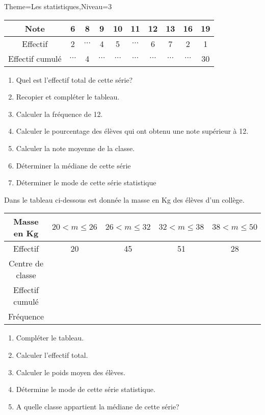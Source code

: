 \documentclass[a4paper,12pt]{article}
\begin{document}
\begin{Maquette}[Fiche]{Theme=Les statistiques,Niveau=3}
\begin{exercice}
\begin{tabular}{|c|c|c|c|c|c|c|c|c|c|}
\hline 
Note & 6 & 8 & 9 & 10 & 11 & 12 & 13 & 16 & 19 \\ 
\hline 
Effectif & 2 & $\cdots$ & 4 & 5 & $\cdots$ & 6 & 7 & 2 & 1 \\ 
\hline 
Effectif cumulé & $\cdots$ & 4 & $\cdots$ & $\cdots$ & $\cdots$ & $\cdots$ & $\cdots$ & $\cdots$ & 30 \\ 
\hline 
\end{tabular} 
\begin{enumerate}
\item Quel est l'effectif total de cette série?
\item Recopier et compléter le tableau.
\item Calculer la fréquence de 12.
\item Calculer le pourcentage des élèves qui ont obtenu une note supérieur à 12.
\item Calculer la note moyenne de la classe.
\item Déterminer la médiane de cette série
\item Déterminer le mode de cette série statistique
\end{enumerate}
\end{exercice}

\begin{exercice}
Dans le tableau ci-dessous est donnée la masse en Kg des élèves d'un collège.

\begin{tabular}{|c|c|c|c|c|}
\hline 
Masse en Kg & $20<m\leq 26$ & $26<m\leq 32$  & $32<m\leq 38$  & $38<m\leq 50$  \\ 
\hline 
Effectif & 20 & 45 & 51 & 28 \\ 
\hline 
Centre de classe &  &  &  &  \\ 
\hline 
Effectif cumulé &  &  &  &  \\ 
\hline 
Fréquence &  &  &  &  \\ 
\hline 
\end{tabular} 
\begin{enumerate}
\item Compléter le tableau.
\item Calculer l'effectif total.
\item Calculer le poids moyen des élèves.
\item Détermine le mode de cette série statistique.
\item A quelle classe appartient la médiane de cette série?
\end{enumerate}

\end{exercice}



\end{Maquette}
\end{document}
